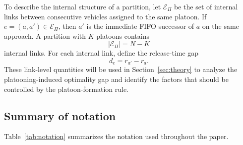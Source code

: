 To describe the internal structure of a partition, let \(\mathcal{E}_{\Pi}\) be the set of internal links between consecutive vehicles assigned to the same platoon. If \(e=(a,a')\in\mathcal{E}_{\Pi}\), then \(a'\) is the immediate FIFO successor of \(a\) on the same approach. A partition with \(K\) platoons contains
\begin{equation}
|\mathcal{E}_{\Pi}|=N-K
\label{eq:number-internal-links}
\end{equation}
internal links. For each internal link, define the release-time gap
\begin{equation}
d_e=r_{a'}-r_a.
\label{eq:release-gap}
\end{equation}
These link-level quantities will be used in Section~\ref{sec:theory} to analyze the platooning-induced optimality gap and identify the factors that should be controlled by the platoon-formation rule.

\subsection{Summary of notation}

Table~\ref{tab:notation} summarizes the notation used throughout the paper.


